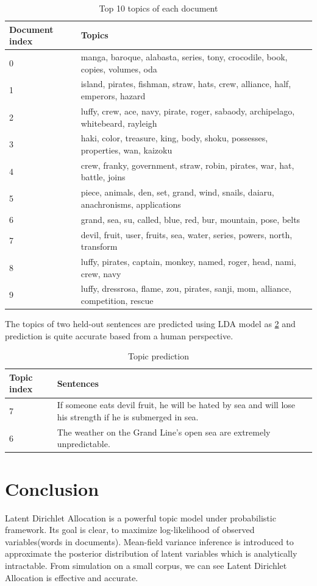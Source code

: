 \documentclass{article}
\begin{document}
\begin{table}[htbp]
	\caption{Top 10 topics of each document}
	\label{table_topics}
	\centering
	\begin{tabular}{ll}
		\toprule
		Document index	& Topics \\
		\midrule
		0 & manga, baroque, alabasta, series, tony, crocodile, book, copies, volumes, oda \\
		1  & island, pirates, fishman, straw, hats, crew, alliance, half, emperors, hazard \\
		2  & luffy, crew, ace, navy, pirate, roger, sabaody, archipelago, whitebeard, rayleigh \\
		3  & haki, color, treasure, king, body, shoku, possesses, properties, wan, kaizoku \\
		4  & crew, franky, government, straw, robin, pirates, war, hat, battle, joins \\
		5  & piece, animals, den, set, grand, wind, snails, daiaru, anachronisms, applications \\
		6  & grand, sea, su, called, blue, red, bur, mountain, pose, belts \\
		7  & devil, fruit, user, fruits, sea, water, series, powers, north, transform \\
		8  & luffy, pirates, captain, monkey, named, roger, head, nami, crew, navy \\
		9  & luffy, dressrosa, flame, zou, pirates, sanji, mom, alliance, competition, rescue \\
		\bottomrule
	\end{tabular}
\end{table}

The topics of two held-out sentences are predicted using LDA model as \ref{table_pred} and prediction is quite accurate based from a human perspective.

\begin{table}[htbp]
	\caption{Topic prediction}
	\label{table_pred}
	\centering
	\begin{tabular}{ll}
		\toprule
		Topic index	& Sentences \\
		\midrule
		7 & If someone eats devil fruit, he will be hated by sea and will lose his strength if he is submerged in sea. \\
		6  & The weather on the Grand Line's open sea are extremely unpredictable. \\
		\bottomrule
	\end{tabular}
\end{table}

\section{Conclusion}

Latent Dirichlet Allocation is a powerful topic model under probabilistic framework. Its goal is clear, to maximize log-likelihood of observed variables(words in documents). Mean-field variance inference is introduced to approximate the posterior distribution of latent variables which is analytically intractable. From simulation on a small corpus, we can see Latent Dirichlet Allocation is effective and accurate.
\end{document}
